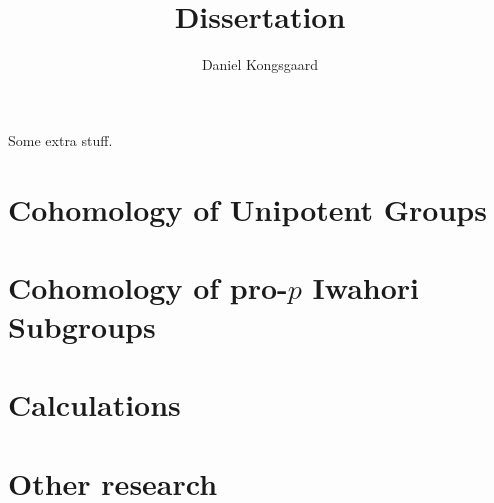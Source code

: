 \documentclass[letterpaper,oneside,english,11pt,openany]{memoir}
\title{Dissertation}
\author{Daniel Kongsgaard}
\begin{document}
\DoubleSpacing




\frontmatter

\tableofcontents

\clearpage

\printnomenclature[4cm]

\clearpage

\listoftables

\clearpage

\begin{vplace}[0.7]
  Some extra stuff.
\end{vplace}

\clearpage


\mainmatter

\pagestyle{ruled}

\chapter{Cohomology of Unipotent Groups}%
\label{cha:cohunigps}



\chapter{Cohomology of pro-\texorpdfstring{$p$}{p} Iwahori Subgroups}%
\label{cha:cohiwagps}



\clearpage


\appendix

\chapter{Calculations}



\chapter{Other research}%
\label{cha:robstat}



\clearpage

\backmatter

\pagestyle{plain}

\printbibliography

\clearpage

\printindex
\end{document}

